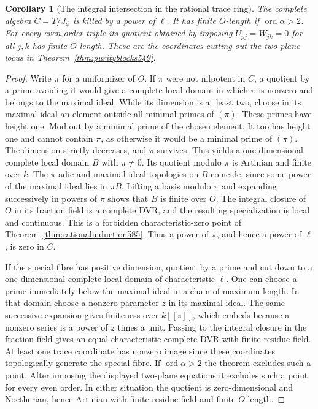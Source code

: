 \documentclass[a4paper,11pt]{article}
\newtheorem{corollary}[proposition]{Corollary}
\theoremstyle{definition}
\theoremstyle{remark}
\numberwithin{equation}{section}
\begin{document}
\begin{corollary}[The integral intersection in the rational trace ring]
\leavevmode\label{cor:integralinduction585}
The complete algebra \(C=T/J_\phi\) is killed by a power of
\(\ell\). It has finite \(O\)-length if
\(\operatorname{ord}\alpha>2\). For every even-order triple
its quotient obtained by imposing \(U_{pj}=W_{jk}=0\) for
all \(j,k\) has finite \(O\)-length. These are the coordinates
cutting out the two-plane locus in Theorem~\ref{thm:purityblocks549}.
\end{corollary}
\begin{proof}
Write \(\pi\) for a uniformizer of \(O\). If \(\pi\) were
not nilpotent in \(C\), a quotient by a prime avoiding it
would give a complete local domain in which \(\pi\) is
nonzero and belongs to the maximal ideal. While its dimension
is at least two, choose in its maximal ideal an element
outside all minimal primes of \((\pi)\). These primes have
height one. Mod out by a minimal prime of the chosen element.
It too has height one and cannot contain \(\pi\), as otherwise
it would be a minimal prime of \((\pi)\). The dimension
strictly decreases, and \(\pi\) survives. This yields a
one-dimensional complete local domain \(B\) with \(\pi\ne0\).
Its quotient modulo \(\pi\) is Artinian and finite over \(k\).
The \(\pi\)-adic and maximal-ideal topologies on \(B\) coincide,
since some power of the maximal ideal lies in \(\pi B\).
Lifting a basis modulo \(\pi\) and expanding successively in
powers of \(\pi\) shows that \(B\) is finite over \(O\).
The integral closure of \(O\) in its fraction field is a
complete DVR, and the resulting specialization is local
and continuous. This is a forbidden characteristic-zero
point of Theorem~\ref{thm:rationalinduction585}. Thus a power
of \(\pi\), and hence a power of \(\ell\), is zero in \(C\).

If the special fibre has positive dimension, quotient by a
prime and cut down to a one-dimensional complete local domain
of characteristic \(\ell\). One can choose a prime immediately
below the maximal ideal in a chain of maximum length. In that
domain choose a nonzero parameter \(z\) in its maximal ideal.
The same successive expansion gives finiteness over \(k[[z]]\),
which embeds because a nonzero series is a power of \(z\)
times a unit. Passing to the integral closure in the fraction
field gives an equal-characteristic complete DVR with finite
residue field. At least one trace coordinate has nonzero image
since these coordinates topologically generate the special
fibre. If \(\operatorname{ord}\alpha>2\) the theorem excludes
such a point. After imposing the displayed two-plane equations
it excludes such a point for every even order. In either
situation the quotient is zero-dimensional and Noetherian,
hence Artinian with finite residue field and finite \(O\)-length.
\end{proof}
\end{document}
